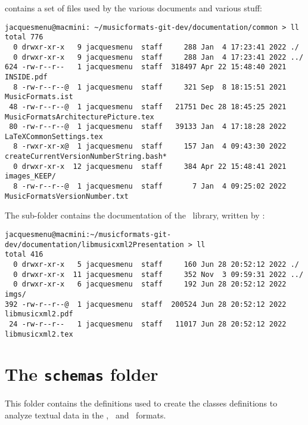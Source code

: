  contains a set of files used by the various documents and various stuff:
\begin{lstlisting}[language=Terminal]
jacquesmenu@macmini: ~/musicformats-git-dev/documentation/common > ll
total 776
  0 drwxr-xr-x   9 jacquesmenu  staff     288 Jan  4 17:23:41 2022 ./
  0 drwxr-xr-x   9 jacquesmenu  staff     288 Jan  4 17:23:41 2022 ../
624 -rw-r--r--   1 jacquesmenu  staff  318497 Apr 22 15:48:40 2021 INSIDE.pdf
  8 -rw-r--r--@  1 jacquesmenu  staff     321 Sep  8 18:15:51 2021 MusicFormats.ist
 48 -rw-r--r--@  1 jacquesmenu  staff   21751 Dec 28 18:45:25 2021 MusicFormatsArchitecturePicture.tex
 80 -rw-r--r--@  1 jacquesmenu  staff   39133 Jan  4 17:18:28 2022 LaTeXCommonSettings.tex
  8 -rwxr-xr-x@  1 jacquesmenu  staff     157 Jan  4 09:43:30 2022 createCurrentVersionNumberString.bash*
  0 drwxr-xr-x  12 jacquesmenu  staff     384 Apr 22 15:48:41 2021 images_KEEP/
  8 -rw-r--r--@  1 jacquesmenu  staff       7 Jan  4 09:25:02 2022 MusicFormatsVersionNumber.txt
\end{lstlisting}

The  sub-folder contains the documentation of the \libmusicxml\ library, written by \fober:
\begin{lstlisting}[language=Terminal]
jacquesmenu@macmini:~/musicformats-git-dev/documentation/libmusicxml2Presentation > ll
total 416
  0 drwxr-xr-x   5 jacquesmenu  staff     160 Jun 28 20:52:12 2022 ./
  0 drwxr-xr-x  11 jacquesmenu  staff     352 Nov  3 09:59:31 2022 ../
  0 drwxr-xr-x   6 jacquesmenu  staff     192 Jun 28 20:52:12 2022 imgs/
392 -rw-r--r--@  1 jacquesmenu  staff  200524 Jun 28 20:52:12 2022 libmusicxml2.pdf
 24 -rw-r--r--   1 jacquesmenu  staff   11017 Jun 28 20:52:12 2022 libmusicxml2.tex
\end{lstlisting}


\section{The {\tt schemas} folder}%

This folder contains the definitions used to create the classes definitions to analyze textual data in the \mxml, \mei\ and \bmml\ formats.


